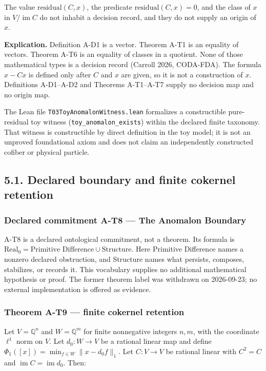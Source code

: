 \documentclass[
  11pt,
]{article}
\begin{document}
The value \(\mathrm{residual}(C,x)\), the predicate \(\mathrm{residual}(C,x)=0\), and the class of \(x\) in \(V/\operatorname{im} C\) do not inhabit a decision record, and they do not supply an origin of \(x\).

\textbf{Explication.} Definition A-D1 is a vector. Theorem A-T1 is an equality of vectors. Theorem A-T6 is an equality of classes in a quotient. None of those mathematical types is a decision record (Carroll 2026, CODA-FDA). The formula \(x-Cx\) is defined only after \(C\) and \(x\) are given, so it is not a construction of \(x\). Definitions A-D1--A-D2 and Theorems A-T1--A-T7 supply no decision map and no origin map.

The Lean file \nolinkurl{T03ToyAnomalonWitness.lean} formalizes a constructible pure-residual toy witness (\nolinkurl{toy_anomalon_exists}) within the declared finite taxonomy. That witness is constructible by direct definition in the toy model; it is not an unproved foundational axiom and does not claim an independently constructed cofiber or physical particle.

\subsection{5.1. Declared boundary and finite cokernel retention}\label{declared-boundary-and-finite-cokernel-retention}

\subsubsection{Declared commitment A-T8 --- The Anomalon Boundary}\label{declared-commitment-a-t8-the-anomalon-boundary}

A-T8 is a declared ontological commitment, not a theorem. Its formula is \(\mathrm{Real}_0=\text{Primitive Difference}\cup\text{Structure}\). Here Primitive Difference names a nonzero declared obstruction, and Structure names what persists, composes, stabilizes, or records it. This vocabulary supplies no additional mathematical hypothesis or proof. The former theorem label was withdrawn on 2026-09-23; no external implementation is offered as evidence.

\subsubsection{Theorem A-T9 --- finite cokernel retention}\label{theorem-a-t9-finite-cokernel-retention}

Let \(V=\mathbb Q^n\) and \(W=\mathbb Q^m\) for finite nonnegative integers \(n,m\), with the coordinate \(\ell^1\) norm on \(V\). Let \(d_0:W\to V\) be a rational linear map and define \(\Phi_1([x])=\min_{f\in W}\|x-d_0f\|_1\). Let \(C:V\to V\) be rational linear with \(C^2=C\) and \(\operatorname{im}C=\operatorname{im}d_0\). Then:
\end{document}
